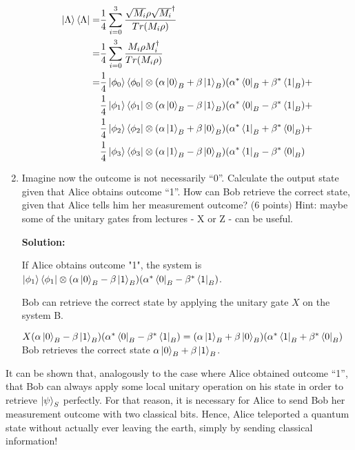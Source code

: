 \documentclass[12pt]{article}
\begin{document}
\begin{enumerate}
          \begin{align}
              \ket{\Lambda}\bra{\Lambda} = & \frac{1}{4}\sum_{i=0}^{3}\frac{\sqrt{M_i} \rho\sqrt{M_i}^{\dagger}}{Tr(M_i\rho)}                                 \\
              =                            & \frac{1}{4}\sum_{i=0}^{3}\frac{M_i \rho M_i^{\dagger}}{Tr(M_i\rho)}                                              \\
              =                            & \frac{1}{4}\ket{\phi_0}\bra{\phi_0}\otimes (\alpha\ket{0}_B+\beta\ket{1}_B)(\alpha^*\bra{0}_B+\beta^*\bra{1}_B)+ \\
                                           & \frac{1}{4}\ket{\phi_1}\bra{\phi_1}\otimes (\alpha\ket{0}_B-\beta\ket{1}_B)(\alpha^*\bra{0}_B-\beta^*\bra{1}_B)+ \\
                                           & \frac{1}{4}\ket{\phi_2}\bra{\phi_2}\otimes (\alpha\ket{1}_B+\beta\ket{0}_B)(\alpha^*\bra{1}_B+\beta^*\bra{0}_B)+ \\
                                           & \frac{1}{4}\ket{\phi_3}\bra{\phi_3}\otimes (\alpha\ket{1}_B-\beta\ket{0}_B)(\alpha^*\bra{1}_B-\beta^*\bra{0}_B)
          \end{align}



    \item Imagine now the outcome is not necessarily “0”. Calculate the output state given that Alice obtains outcome
          “1”. How can Bob retrieve the correct state, given that Alice tells him her measurement outcome? (6 points)
          Hint: maybe some of the unitary gates from lectures - X or Z - can be useful.


          \textbf{Solution:}

          If Alice obtains outcome "1", the system is $\ket{\phi_1}\bra{\phi_1}\otimes (\alpha\ket{0}_B-\beta\ket{1}_B)(\alpha^*\bra{0}_B-\beta^*\bra{1}_B)$.

          Bob can retrieve the correct state by applying the unitary gate $X$ on the system B.

          $X(\alpha\ket{0}_B-\beta\ket{1}_B)(\alpha^*\bra{0}_B-\beta^*\bra{1}_B) = (\alpha\ket{1}_B+\beta\ket{0}_B)(\alpha^*\bra{1}_B+\beta^*\bra{0}_B)$
          Bob retrieves the correct state $\alpha\ket{0}_B+\beta\ket{1}_B$.


\end{enumerate}

It can be shown that, analogously to the case where Alice obtained outcome “1”, that Bob can always apply some local unitary operation on his state in order to retrieve $\ket{\psi}_S$ perfectly. For that reason, it is necessary for Alice to send Bob her measurement outcome with two classical bits. Hence, Alice teleported a quantum state without actually ever leaving the earth, simply by sending classical information!
\end{document}
